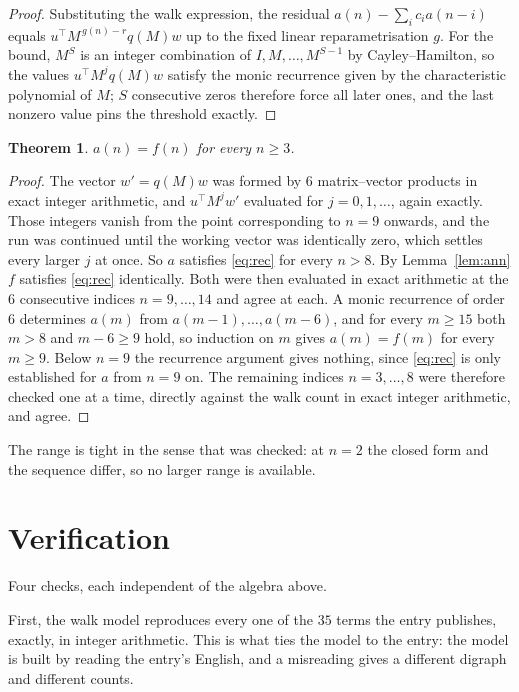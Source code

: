 \documentclass[11pt,a4paper]{article}
\theoremstyle{plain}
\newtheorem{theorem}{Theorem}
\theoremstyle{definition}
\begin{document}
\begin{proof}
Substituting the walk expression, the residual $a(n)-\sum_ic_ia(n-i)$ equals
$u^{\!\top}M^{\,g(n)-r}q(M)w$ up to the fixed linear reparametrisation $g$. For the bound,
$M^{S}$ is an integer combination of $I,M,\dots,M^{S-1}$ by Cayley--Hamilton, so the values
$u^{\!\top}M^{j}q(M)w$ satisfy the monic recurrence given by the characteristic polynomial of
$M$; $S$ consecutive zeros therefore force all later ones, and the last nonzero value pins the
threshold exactly.
\end{proof}

\begin{theorem}
$a(n)=f(n)$ for every $n\ge3$.
\end{theorem}

\begin{proof}
The vector $w'=q(M)w$ was formed by $6$ matrix--vector products in exact integer
arithmetic, and $u^{\!\top}M^{j}w'$ evaluated for $j=0,1,\dots$, again exactly. Those integers
vanish from the point corresponding to $n=9$ onwards, and the run was continued until the
working vector was identically zero, which settles every larger $j$ at once. So $a$ satisfies
\eqref{eq:rec} for every $n>8$. By Lemma~\ref{lem:ann} $f$ satisfies \eqref{eq:rec}
identically. Both were then evaluated in exact arithmetic at the $6$ consecutive indices
$n=9,\dots,14$ and agree at each. A monic recurrence of order $6$
determines $a(m)$ from $a(m-1),\dots,a(m-6)$, and for every $m\ge15$ both
$m>8$ and $m-6\ge9$ hold, so induction on $m$ gives $a(m)=f(m)$ for every
$m\ge9$.
Below $n=9$ the recurrence argument gives nothing, since \eqref{eq:rec} is only
established for $a$ from $n=9$ on. The remaining indices $n=3,\dots,8$ were
therefore checked one at a time, directly against the walk count in exact integer arithmetic,
and agree.
\end{proof}

The range is tight in the sense that was checked: at $n=2$ the closed form and the sequence differ, so no larger range is available.

\section{Verification}

Four checks, each independent of the algebra above.

First, the walk model reproduces every one of the $35$ terms the entry publishes,
exactly, in integer arithmetic. This is what ties the model to the entry: the model is built
by reading the entry's English, and a misreading gives a different digraph and different
counts.
\end{document}
